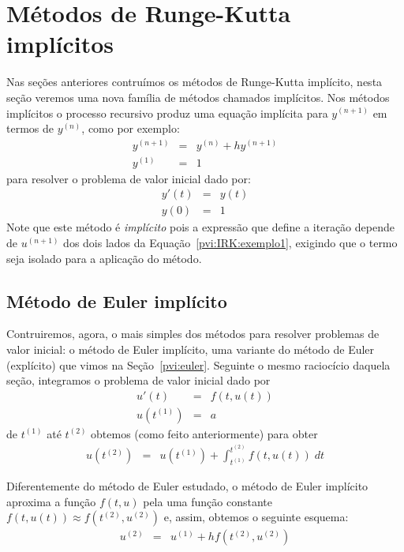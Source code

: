\section{Métodos de Runge-Kutta implícitos}\label{pvi:sec_IRK}
Nas seções anteriores contruímos os métodos de Runge-Kutta implícito, nesta seção veremos uma nova família de métodos chamados implícitos. Nos métodos implícitos o processo recursivo produz uma equação implícita para $y^{(n+1)}$ em termos de $y^{(n)}$, como por exemplo:
\begin{eqnarray}\label{pvi:IRK:exemplo1}
 y^{(n+1)}&=&y^{(n)}+h y^{(n+1)}\\
 y^{(1)}&=&1
\end{eqnarray}
para resolver o problema de valor inicial dado por:
\begin{eqnarray*}
 y'(t)&=&y(t)\\
 y(0)&=&1
 \end{eqnarray*}
Note que este método é \emph{implícito} pois a expressão que define a iteração depende de $u^{(n+1)}$ dos dois lados da Equação~\eqref{pvi:IRK:exemplo1}, exigindo que o termo seja isolado para a aplicação do método. 
 

\subsection{Método de Euler implícito}\label{pvi:euler_imp}
Contruiremos, agora, o mais simples dos métodos para resolver problemas de valor inicial: o método de Euler implícito, uma variante do método de Euler (explícito) que vimos na Seção~\ref{pvi:euler}. Seguinte o mesmo raciocício daquela seção, integramos o problema de valor inicial dado por
\begin{eqnarray}
  u'(t)  &=& f(t,u(t)) \\
  u(t^{(1)}) &=& a
\end{eqnarray}
de $t^{(1)}$ até $t^{(2)}$ obtemos (como feito anteriormente) para obter
\begin{eqnarray}
  u(t^{(2)})      &=& u(t^{(1)}) +  \int_{t^{(1)}}^{t^{(2)}} f(t,u(t)) \; dt
\end{eqnarray}

Diferentemente do método de Euler estudado, o método de Euler implícito aproxima a função $f(t,u)$ pela uma função constante $f(t,u(t)) \approx  f(t^{(2)},u^{(2)})$ e, assim, obtemos o seguinte esquema:
\begin{eqnarray}
   u^{(2)} &=&  u^{(1)} + h f(t^{(2)},u^{(2)})
\end{eqnarray}


